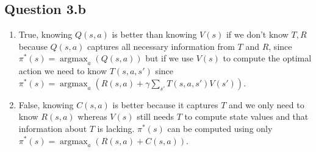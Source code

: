 \documentclass[12pt]{article}
\newcommand{\argmax}{\mathop{\mathrm{argmax}}}
\begin{document}
\subsection*{Question 3.b}
\begin{enumerate}
    \item 
    \begin{tcolorbox}[fit,height=4cm, width=\textwidth, blank, borderline={1pt}{-2pt},nobeforeafter]
    True, knowing $Q(s,a)$ is better than knowing $V(s)$ if we don't know $T, R$ because $Q(s,a)$ captures all necessary information from $T$ and $R$, %
    since $\pi^*(s)=\argmax_a(Q(s,a))$ but if we use $V(s)$ to compute the optimal action we need to know $T(s,a,s')$ since  $\pi^*(s)=\argmax_a(R(s,a)+\gamma\sum_{s'}T(s,a,s') V(s'))$.
    \end{tcolorbox}
    \item 
    \begin{tcolorbox}[fit,height=4cm, width=\textwidth, blank, borderline={1pt}{-2pt},nobeforeafter]
    False, knowing $C(s,a)$ is better because it captures $T$ and we only need to know $R(s,a)$ whereas $V(s)$ still needs $T$ to compute state values and that information about $T$ is lacking. $\pi^*(s)$ can be computed using only $\pi^*(s) = \argmax_a ( R(s,a) + C(s,a))$.
    \end{tcolorbox}
\end{enumerate}


\newpage
\end{document}
